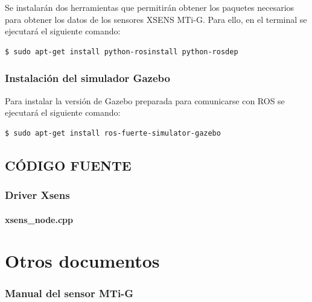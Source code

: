 \documentclass[10pt,a4paper]{report}
\begin{document}
Se instalarán dos herramientas que permitirán obtener los paquetes necesarios para obtener los datos de los sensores XSENS MTi-G. Para ello, en el terminal se ejecutará el siguiente comando:

\begin{verbatim}
$ sudo apt-get install python-rosinstall python-rosdep
\end{verbatim}

\section{Instalación del simulador Gazebo}

Para instalar la versión de Gazebo preparada para comunicarse con ROS se ejecutará el siguiente comando:

\begin{verbatim}
$ sudo apt-get install ros-fuerte-simulator-gazebo
\end{verbatim}


\chapter{CÓDIGO FUENTE}

\section{Driver Xsens}

\subsection{xsens\_node.cpp}

\newpage

\part{Otros documentos}

\section{Manual del sensor MTi-G}


\end{document}
